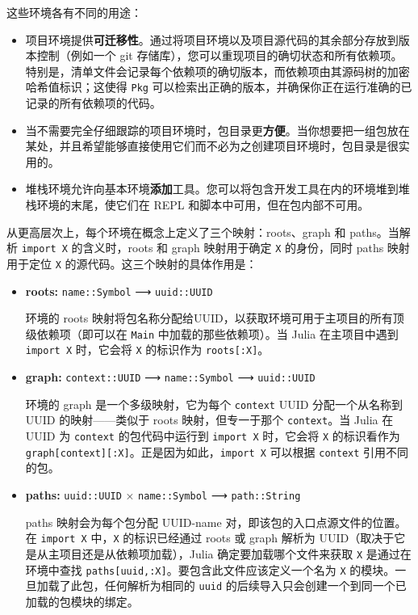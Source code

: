 这些环境各有不同的用途：



\begin{itemize}
\item 项目环境提供\textbf{可迁移性}。通过将项目环境以及项目源代码的其余部分存放到版本控制（例如一个 git 存储库），您可以重现项目的确切状态和所有依赖项。特别是，清单文件会记录每个依赖项的确切版本，而依赖项由其源码树的加密哈希值标识；这使得 \texttt{Pkg} 可以检索出正确的版本，并确保你正在运行准确的已记录的所有依赖项的代码。


\item 当不需要完全仔细跟踪的项目环境时，包目录更\textbf{方便}。当你想要把一组包放在某处，并且希望能够直接使用它们而不必为之创建项目环境时，包目录是很实用的。


\item 堆栈环境允许向基本环境\textbf{添加}工具。您可以将包含开发工具在内的环境堆到堆栈环境的末尾，使它们在 REPL 和脚本中可用，但在包内部不可用。

\end{itemize}


从更高层次上，每个环境在概念上定义了三个映射：roots、graph 和 paths。当解析 \texttt{import X} 的含义时，roots 和 graph 映射用于确定 \texttt{X} 的身份，同时 paths 映射用于定位 \texttt{X} 的源代码。这三个映射的具体作用是：



\begin{itemize}
\item \textbf{roots:} \texttt{name::Symbol} ⟶ \texttt{uuid::UUID}

环境的 roots 映射将包名称分配给UUID，以获取环境可用于主项目的所有顶级依赖项（即可以在 \texttt{Main} 中加载的那些依赖项）。当 Julia 在主项目中遇到 \texttt{import X} 时，它会将 \texttt{X} 的标识作为 \texttt{roots[:X]}。


\item \textbf{graph:} \texttt{context::UUID} ⟶ \texttt{name::Symbol} ⟶ \texttt{uuid::UUID}

环境的 graph 是一个多级映射，它为每个 \texttt{context} UUID 分配一个从名称到 UUID 的映射——类似于 roots 映射，但专一于那个 \texttt{context}。当 Julia 在 UUID 为 \texttt{context} 的包代码中运行到 \texttt{import X} 时，它会将 \texttt{X} 的标识看作为 \texttt{graph[context][:X]}。正是因为如此，\texttt{import X} 可以根据 \texttt{context} 引用不同的包。


\item \textbf{paths:} \texttt{uuid::UUID} × \texttt{name::Symbol} ⟶ \texttt{path::String}

paths 映射会为每个包分配 UUID-name 对，即该包的入口点源文件的位置。在 \texttt{import X} 中，\texttt{X} 的标识已经通过 roots 或 graph 解析为 UUID（取决于它是从主项目还是从依赖项加载），Julia 确定要加载哪个文件来获取 \texttt{X} 是通过在环境中查找 \texttt{paths[uuid,:X]}。要包含此文件应该定义一个名为 \texttt{X} 的模块。一旦加载了此包，任何解析为相同的 \texttt{uuid} 的后续导入只会创建一个到同一个已加载的包模块的绑定。

\end{itemize}


